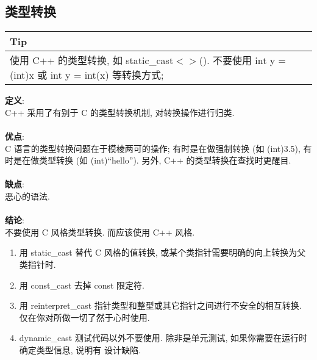 \documentclass[a4paper,11pt,CJK]{article}
\begin{document}
\begin{CJK}{UTF8}{gbsn}
\subsection{类型转换}
\begin{table}[htbp]
\flushleft
\begin{tabular}{p{400pt}}
\toprule
\rowcolor[gray]{.8} Tip \\
\midrule
使用 C++ 的类型转换, 如 static\_cast$<$$>$(). 不要使用 int y = (int)x 或 int y = int(x) 等转换方式;\\
\bottomrule
\end{tabular}
\end{table}
\noindent
\textbf{定义}:\\
\indent C++ 采用了有别于 C 的类型转换机制, 对转换操作进行归类.\\
\\
\textbf{优点}:\\
\indent C 语言的类型转换问题在于模棱两可的操作; 有时是在做强制转换 (如 (int)3.5), 有时是在做类型转换 (如 (int)``hello''). 另外, C++ 的类型转换在查找时更醒目.\\
\\
\textbf{缺点}:\\
\indent 恶心的语法.\\
\\
\textbf{结论}:\\
\indent 不要使用 C 风格类型转换. 而应该使用 C++ 风格.
\begin{enumerate}
\item
用 static\_cast 替代 C 风格的值转换, 或某个类指针需要明确的向上转换为父类指针时.
\item
用 const\_cast 去掉 const 限定符.
\item
用 reinterpret\_cast 指针类型和整型或其它指针之间进行不安全的相互转换. 仅在你对所做一切了然于心时使用.
\item
dynamic\_cast 测试代码以外不要使用. 除非是单元测试, 如果你需要在运行时确定类型信息, 说明有 设计缺陷.
\end{enumerate}

\end{CJK}
\end{document}
